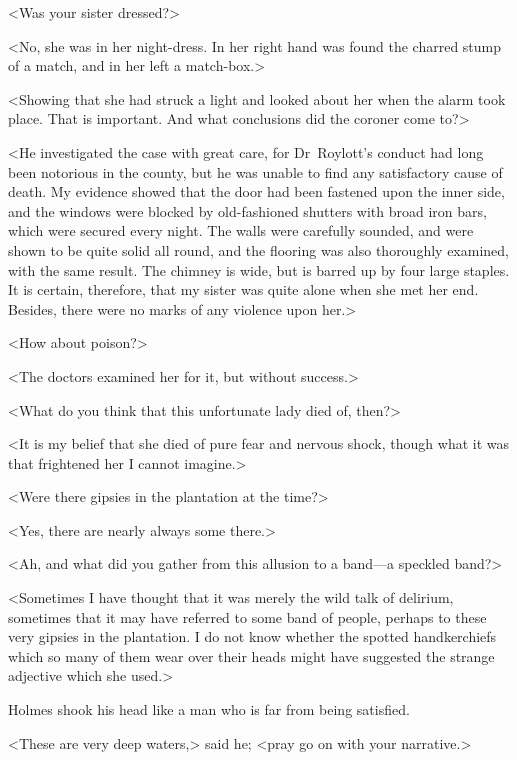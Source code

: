 <Was your sister dressed?>

<No, she was in her night-dress. In her right hand was found the charred stump of a match, and in her left a match-box.>

<Showing that she had struck a light and looked about her when the alarm took place. That is important. And what conclusions did the coroner come to?>

<He investigated the case with great care, for Dr~Roylott's conduct had long been notorious in the county, but he was unable to find any satisfactory cause of death. My evidence showed that the door had been fastened upon the inner side, and the windows were blocked by old-fashioned shutters with broad iron bars, which were secured every night. The walls were carefully sounded, and were shown to be quite solid all round, and the flooring was also thoroughly examined, with the same result. The chimney is wide, but is barred up by four large staples. It is certain, therefore, that my sister was quite alone when she met her end. Besides, there were no marks of any violence upon her.>

<How about poison?>

<The doctors examined her for it, but without success.>

<What do you think that this unfortunate lady died of, then?>

<It is my belief that she died of pure fear and nervous shock, though what it was that frightened her I cannot imagine.>

<Were there gipsies in the plantation at the time?>

<Yes, there are nearly always some there.>

<Ah, and what did you gather from this allusion to a band—a speckled band?>

<Sometimes I have thought that it was merely the wild talk of delirium, sometimes that it may have referred to some band of people, perhaps to these very gipsies in the plantation. I do not know whether the spotted handkerchiefs which so many of them wear over their heads might have suggested the strange adjective which she used.>

Holmes shook his head like a man who is far from being satisfied.

<These are very deep waters,> said he; <pray go on with your narrative.>

